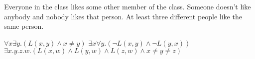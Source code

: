 \documentclass[solution, letterpaper]{cs20inclass}
\begin{document}
\subproblem Everyone in the class likes some other member of the class.
\subproblem Someone doesn't like anybody and nobody likes that person.
\subproblem At least three different people like the same person.

\begin{solution}

\subsolution $\forall x \exists y . (L(x,y) \wedge x \neq y)$
\subsolution $\exists x \forall y . (\lnot L(x,y) \wedge \lnot L(y,x))$
\subsolution $\exists x. y. z. w. (L(x,w) \land L(y,w) \land L(z,w) \land x \neq y \neq z)$

\end{solution}
\end{document}
